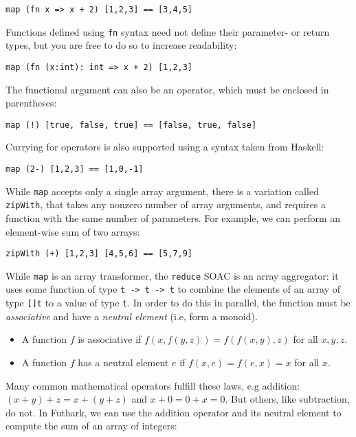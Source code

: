 \documentclass[oneside,11pt]{book}
\begin{document}
\begin{lstlisting}
map (fn x => x + 2) [1,2,3] == [3,4,5]
\end{lstlisting}

Functions defined using \texttt{fn} syntax need not define their
parameter- or return types, but you are free to do so to increase
readability:

\begin{lstlisting}
map (fn (x:int): int => x + 2) [1,2,3]
\end{lstlisting}

The functional argument can also be an operator, which must be
enclosed in parentheses:

\begin{lstlisting}
map (!) [true, false, true] == [false, true, false]
\end{lstlisting}

Currying for operators is also supported using a syntax taken from
Haskell:

\begin{lstlisting}
map (2-) [1,2,3] == [1,0,-1]
\end{lstlisting}

While \texttt{map} accepts only a single array argument, there is a
variation called \texttt{zipWith}, that takes any nonzero number of
array arguments, and requires a function with the same number of
parameters.  For example, we can perform an element-wise sum of two
arrays:

\begin{lstlisting}
zipWith (+) [1,2,3] [4,5,6] == [5,7,9]
\end{lstlisting}

While \texttt{map} is an array transformer, the \texttt{reduce} SOAC
is an array aggregator: it uses some function of type \texttt{t -> t
  -> t} to combine the elements of an array of type \texttt{[]t} to a
value of type \texttt{t}.  In order to do this in parallel, the
function must be \textit{associative} and have a \textit{neutral
  element} (i.e, form a monoid).

\begin{itemize}
\item A function $f$ is associative if $f(x,f(y,z)) = f(f(x,y),z)$ for
  all $x,y,z$.
\item A function $f$ has a neutral element $e$ if
  $f(x,e) = f(e,x) = x$ for all $x$.
\end{itemize}

Many common mathematical operators fulfill these laws, e.g addition:
$(x+y)+z=x+(y+z)$ and $x+0=0+x=0$.  But others, like subtraction, do
not.  In Futhark, we can use the addition operator and its neutral
element to compute the sum of an array of integers:
\end{document}
